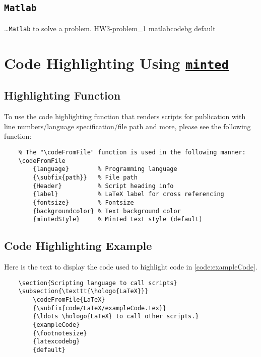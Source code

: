 \documentclass[../Dissertation]{subfiles}
\begin{document}
\subsection{\texttt{Matlab}}
    {}
    {\ldots \texttt{Matlab} to solve a problem.}
    {HW3-problem_1}
    {\footnotesize}
    {matlabcodebg}
    {default}
    
\section{Code Highlighting Using
\href{https://ctan.org/pkg/minted?lang=en}{\texttt{minted}}}
\subsection{Highlighting Function}
    To use the code highlighting function that renders scripts for publication
    with line numbers/language specification/file path and more, please see the
    following function:
    
    {\singlespacing
    \begin{verbatim}
    % The "\codeFromFile" function is used in the following manner:
    \codeFromFile
        {language}        % Programming language
        {\subfix{path}}   % File path
        {Header}          % Script heading info
        {label}           % LaTeX label for cross referencing
        {fontsize}        % Fontsize
        {backgroundcolor} % Text background color
        {mintedStyle}     % Minted text style (default)
    \end{verbatim}
    }

\subsection{Code Highlighting Example}
    Here is the text to display the code used to highlight  code in
    \cref{code:exampleCode}.
    
    {\singlespacing
    \begin{verbatim}
    \section{Scripting language to call scripts}
    \subsection{\texttt{\hologo{LaTeX}}}
        \codeFromFile{LaTeX}
        {\subfix{code/LaTeX/exampleCode.tex}}
        {\ldots \hologo{LaTeX} to call other scripts.}
        {exampleCode}
        {\footnotesize}
        {latexcodebg}
        {default}
    \end{verbatim}
    }
    
\end{document}
